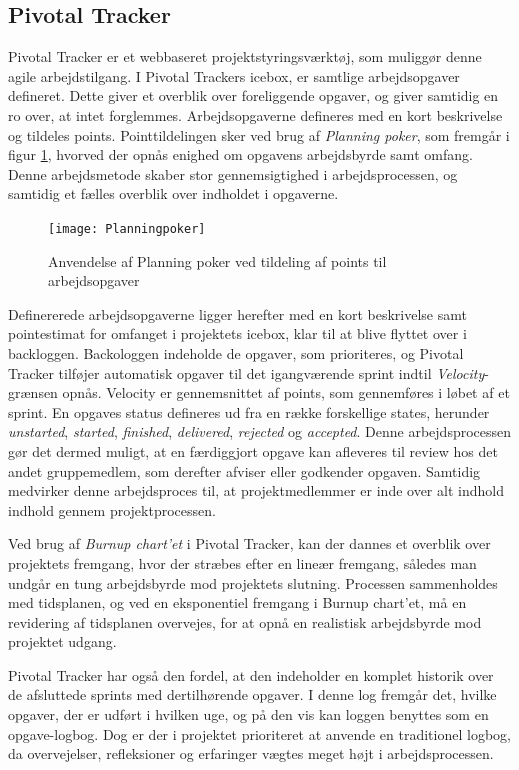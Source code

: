 	\subsection{Pivotal Tracker}
	\label{subsec:pivotal}
	Pivotal Tracker er et webbaseret projektstyringsværktøj, som muliggør denne agile arbejdstilgang. I Pivotal Trackers icebox, er samtlige arbejdsopgaver defineret. Dette giver et overblik over foreliggende opgaver, og giver samtidig en ro over, at intet forglemmes. Arbejdsopgaverne defineres med en kort beskrivelse og tildeles points. Pointtildelingen sker ved brug af \textit{Planning poker}, som fremgår i figur \ref{fig:planningpoker}, hvorved der opnås enighed om opgavens arbejdsbyrde samt omfang. Denne arbejdsmetode skaber stor gennemsigtighed i arbejdsprocessen, og samtidig et fælles overblik over indholdet i opgaverne. 
	
	\begin{figure}[htb]
	\centering
	\texttt{[image: Planningpoker]}
	\caption{Anvendelse af Planning poker ved tildeling af points til arbejdsopgaver}
	\label{fig:planningpoker}	
	\end{figure}
	 
	Definererede arbejdsopgaverne ligger herefter med en kort beskrivelse samt pointestimat for omfanget i projektets icebox, klar til at blive flyttet over i backloggen. Backologgen indeholde de opgaver, som prioriteres, og Pivotal Tracker tilføjer automatisk opgaver til det igangværende sprint indtil \textit{Velocity}-grænsen opnås. Velocity er gennemsnittet af points, som gennemføres i løbet af et sprint. En opgaves status defineres ud fra en række forskellige states, herunder \textit{unstarted}, \textit{started}, \textit{finished}, \textit{delivered}, \textit{rejected} og \textit{accepted}. Denne arbejdsprocessen gør det dermed muligt, at en færdiggjort opgave kan afleveres til review hos det andet gruppemedlem, som derefter afviser eller godkender opgaven. Samtidig medvirker denne arbejdsproces til, at projektmedlemmer er inde over alt indhold indhold gennem projektprocessen.     
	
	Ved brug af \textit{Burnup chart'et} i Pivotal Tracker, kan der dannes et overblik over projektets fremgang, hvor der stræbes efter en lineær fremgang, således man undgår en tung arbejdsbyrde mod projektets slutning. Processen sammenholdes med tidsplanen, og ved en eksponentiel fremgang i Burnup chart'et, må en revidering af tidsplanen overvejes, for at opnå en realistisk arbejdsbyrde mod projektet udgang.  
	
	Pivotal Tracker har også den fordel, at den indeholder en komplet historik over de afsluttede sprints med dertilhørende opgaver. I denne log fremgår det, hvilke opgaver, der er udført i hvilken uge, og på den vis kan loggen benyttes som en opgave-logbog. Dog er der i projektet prioriteret at anvende en traditionel logbog, da overvejelser, refleksioner og erfaringer vægtes meget højt i arbejdsprocessen.      		
	
